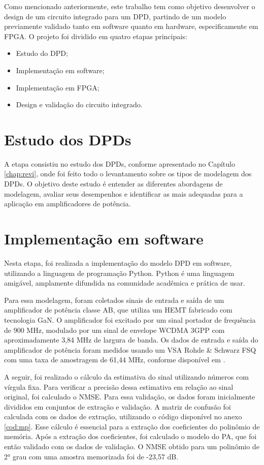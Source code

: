 Como mencionado anteriormente, este trabalho tem como objetivo desenvolver o design de um circuito integrado para um DPD, partindo de um modelo previamente validado tanto em software quanto em hardware, especificamente em FPGA. O projeto foi dividido em quatro etapas principais:

\begin{itemize}
\item Estudo do DPD;
\item Implementação em software;
\item Implementação em FPGA;
\item Design e validação do circuito integrado.
\end{itemize}


\section{Estudo dos DPDs}
A etapa consistiu no estudo dos DPDs, conforme apresentado no Capítulo \ref{chap:revi}, onde foi feito todo o levantamento sobre os tipos de modelagem dos DPDs. O objetivo deste estudo é entender as diferentes abordagens de modelagem, avaliar seus desempenhos e identificar as mais adequadas para a aplicação em amplificadores de potência.

\section{Implementação em software} \label{sec:implsoft}

Nesta etapa, foi realizada a implementação do modelo DPD em software, utilizando a linguagem de programação Python. Python é uma linguagem amigável, amplamente difundida na comunidade acadêmica e prática de usar.

Para essa modelagem, foram coletados sinais de entrada e saída de um amplificador de potência classe AB, que utiliza um HEMT fabricado com tecnologia GaN. O amplificador foi excitado por um sinal portador de frequência de 900 MHz, modulado por um sinal de envelope WCDMA 3GPP com aproximadamente 3,84 MHz de largura de banda. Os dados de entrada e saída do amplificador de potência foram medidos usando um VSA Rohde \& Schwarz FSQ com uma taxa de amostragem de 61,44 MHz, conforme disponível em \cite{Bonfim2016}.

A seguir, foi realizado o cálculo da estimativa do sinal utilizando números com vírgula fixa. Para verificar a precisão dessa estimativa em relação ao sinal original, foi calculado o NMSE. Para essa validação, os dados foram inicialmente divididos em conjuntos de extração e validação. A matriz de confusão foi calculada com os dados de extração, utilizando o código disponível no anexo \ref{cod:mp}. Esse cálculo é essencial para a extração dos coeficientes do polinômio de memória. Após a extração dos coeficientes, foi calculado o modelo do PA, que foi então validado com os dados de validação. O NMSE obtido para um polinômio de 2° grau com uma amostra memorizada foi de -23,57 dB.

